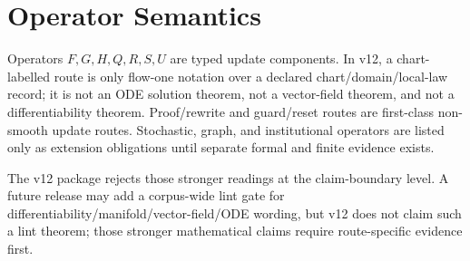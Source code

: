 \section{Operator Semantics}

Operators \(F,G,H,Q,R,S,U\) are typed update components. In v12, a chart-labelled route is only
flow-one notation over a declared chart/domain/local-law record; it is not an ODE solution theorem,
not a vector-field theorem, and not a differentiability theorem. Proof/rewrite and guard/reset
routes are first-class non-smooth update routes. Stochastic, graph, and institutional operators are
listed only as extension obligations until separate formal and finite evidence exists.

The v12 package rejects those stronger readings at the claim-boundary level. A future release may add
a corpus-wide lint gate for differentiability/manifold/vector-field/ODE wording, but v12 does not
claim such a lint theorem; those stronger mathematical claims require route-specific evidence first.

